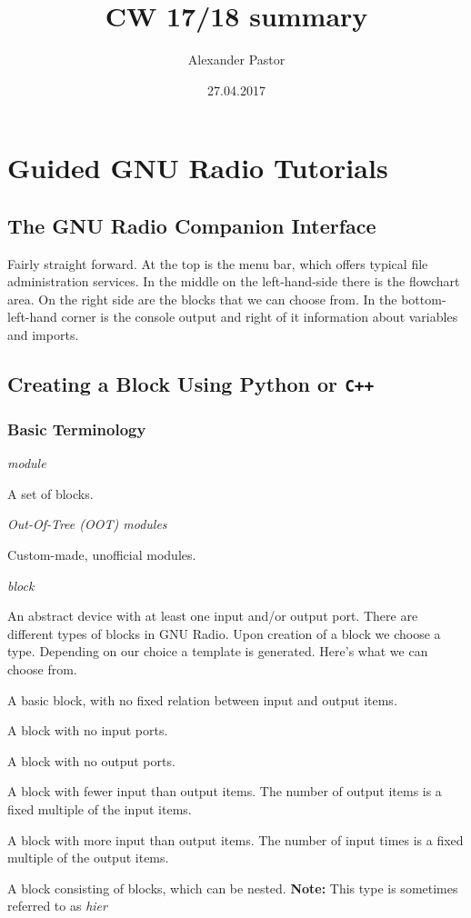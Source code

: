 \documentclass{article}
\begin{document}
\title{CW 17/18 summary}
\author{Alexander Pastor}
\date{27.04.2017}
\maketitle
\tableofcontents
\newpage

\section{Guided GNU Radio Tutorials}

\subsection{The GNU Radio Companion Interface}

Fairly straight forward. At the top is the menu bar, which offers typical file administration services. In the middle on the left-hand-side there is the flowchart area. On the right side are the blocks that we can choose from. In the bottom-left-hand corner is the console output and right of it information about variables and imports.

\subsection{Creating a Block Using Python or \texttt{C++}}

\subsubsection{Basic Terminology}

\emph{module} 

A set of blocks.

\bigskip


\emph{Out-Of-Tree (OOT) modules} 

Custom-made, unofficial modules.

\bigskip

\emph{block}

An abstract device with at least one input and/or output port. There are different types of blocks in GNU Radio. Upon creation of a block we choose a type. Depending on our choice a template is generated. Here's what we can choose from.

\begin{description}[leftmargin=!,labelwidth=1in]
		\item[general]  		A basic block, with no fixed relation between input and output items.
		\item[source]  			A block with no input ports.
		\item[sink]				A block with no output ports.
		\item[interpolator]  	A block with fewer input than output items. The number of output items is a fixed multiple of the input items.
		\item[decimator]  		A block with more input than output items. The number of input times is a fixed multiple of the output items.
		\item[hierarchical]  	A block consisting of blocks, which can be nested. 	\textbf{Note:} This type is sometimes referred to as \emph{hier}
\end{description}
\end{document}
